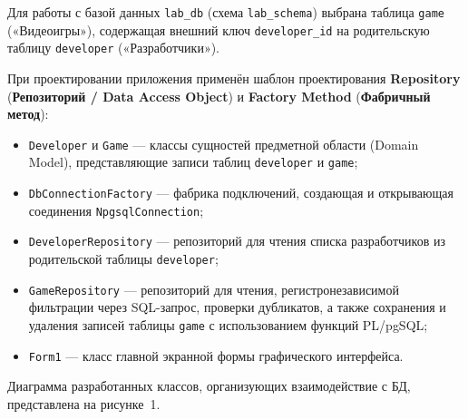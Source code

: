 \documentclass[oneside,a4paper,14pt]{extarticle}
\begin{document}
	Для работы с базой данных \texttt{lab\_db} (схема \texttt{lab\_schema}) выбрана таблица \texttt{game} («Видеоигры»), содержащая внешний ключ \texttt{developer\_id} на родительскую таблицу \texttt{developer} («Разработчики»).
	
	При проектировании приложения применён шаблон проектирования \textbf{Repository} (\textbf{Репозиторий / Data Access Object}) и \textbf{Factory Method} (\textbf{Фабричный метод}):
	\begin{itemize}
		\item \texttt{Developer} и \texttt{Game} --- классы сущностей предметной области (Domain Model), представляющие записи таблиц \texttt{developer} и \texttt{game};
		\item \texttt{DbConnectionFactory} --- фабрика подключений, создающая и открывающая соединения \texttt{NpgsqlConnection};
		\item \texttt{DeveloperRepository} --- репозиторий для чтения списка разработчиков из родительской таблицы \texttt{developer};
		\item \texttt{GameRepository} --- репозиторий для чтения, регистронезависимой фильтрации через SQL-запрос, проверки дубликатов, а также сохранения и удаления записей таблицы \texttt{game} с использованием функций PL/pgSQL;
		\item \texttt{Form1} --- класс главной экранной формы графического интерфейса.
	\end{itemize}
	
	Диаграмма разработанных классов, организующих взаимодействие с БД, представлена на рисунке~1.
	
\end{document}
